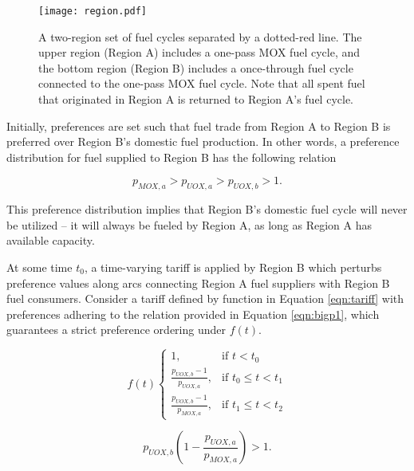 \begin{figure}
  \begin{center}
    \texttt{[image: region.pdf]}
    \caption[]{
      \label{fig:region}
      A two-region set of fuel cycles separated by a dotted-red line. The upper
      region (Region A) includes a one-pass MOX fuel cycle, and the bottom
      region (Region B) includes a once-through fuel cycle connected to the
      one-pass MOX fuel cycle. Note that all spent fuel that originated in
      Region A is returned to Region A's fuel cycle.}
  \end{center}
\end{figure}

Initially, preferences are set such that fuel trade from Region A to
Region B is preferred over Region B's domestic fuel production. In other words, a
preference distribution for fuel supplied to Region B has the following
relation

\begin{equation}\label{eqn:bigdefault}
  p_{MOX, a} > p_{UOX, a} > p_{UOX, b} > 1.
\end{equation}

\noindent
This preference distribution implies that Region B's domestic fuel cycle will
never be utilized -- it will always be fueled by Region A, as long as Region A
has available capacity. 

At some time $t_0$, a time-varying tariff is applied by Region B which perturbs
preference values along arcs connecting Region A fuel suppliers with Region B
fuel consumers. Consider a tariff defined by function in Equation
\ref{eqn:tariff} with preferences adhering to the relation provided in Equation
\ref{eqn:bigp1}, which guarantees a strict preference ordering under $f(t)$.

\begin{equation}\label{eqn:tariff}
f(t)
\begin{cases}
1, & \text{if } t < t_0 \\
\frac{p_{UOX, b} - 1}{p_{UOX, a}}, & \text{if } t_0 \leq t < t_1 \\
\frac{p_{UOX, b} - 1}{p_{MOX, a}}, & \text{if } t_1 \leq t < t_2
\end{cases} 
\end{equation}

\begin{equation}\label{eqn:bigp1}
  p_{UOX, b} \left( 1 - \frac{p_{UOX, a}}{p_{MOX, a}} \right) > 1.
\end{equation}

